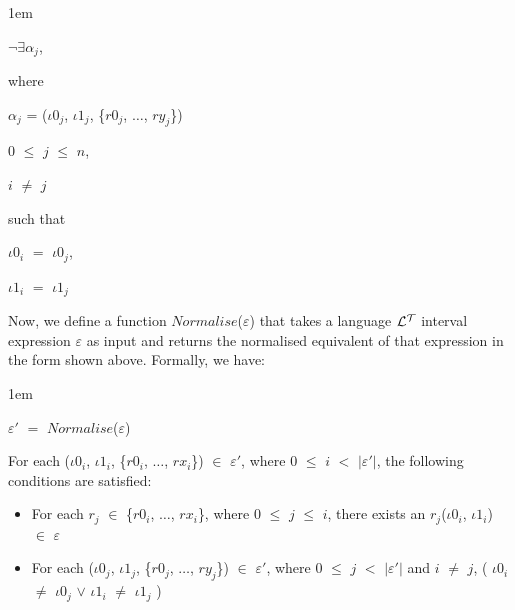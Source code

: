 \documentclass[11pt]{report}
\newenvironment{vquote}
{
  \begin{list}{}{\leftmargin 1em}\item[]
}
{
  \end{list}
}
\begin{document}
\begin{itemize}
              \begin{vquote}
                $\lnot$$\exists$${\alpha}_j$,

                where 

                \hspace{1em}
                ${\alpha}_j$ =
                  (${\iota}0_j$, ${\iota}1_j$, \{$r0_j$, $\ldots$, $ry_j$\})

                \hspace{1em}
                $0$ $\leq$ $j$ $\leq$ $n$,

                \hspace{1em}
                $i$ $\neq$ $j$

                such that

                \hspace{1em}
                ${\iota}0_i$ $=$ ${\iota}0_j$,

                \hspace{1em}
                ${\iota}1_i$ $=$ ${\iota}1_j$
              \end{vquote}

              Now, we define a function $Normalise$($\varepsilon$) that takes
              a language ${\cal L^T}$ interval expression $\varepsilon$ as
              input and returns the normalised equivalent of that expression in
              the form shown above. Formally, we have:

              \begin{vquote}
                ${\varepsilon}'$ $=$ $Normalise$($\varepsilon$)
              \end{vquote}

              \noindent
              For each
              (${\iota}0_i$, ${\iota}1_i$, \{$r0_i$, $\ldots$, $rx_i$\})
              $\in$ ${\varepsilon}'$,
              where $0$ $\leq$ $i$ $<$ $|{\varepsilon}'|$, the following
              conditions are satisfied:

              \begin{itemize}
                \item
                  For each $r_j$ $\in$ \{$r0_i$, $\ldots$, $rx_i$\}, where $0$
                  $\leq$ $j$ $\leq$ $i$, there exists an
                  $r_j$(${\iota}0_i$, ${\iota}1_i$) $\in$ $\varepsilon$

                \item
                  For each 
                  (${\iota}0_j$, ${\iota}1_j$, \{$r0_j$, $\ldots$, $ry_j$\})
                  $\in$ ${\varepsilon}'$, where $0$ $\leq$ $j$ $<$
                  $|{\varepsilon}'|$ and $i$ $\neq$ $j$, 
                  (
                    ${\iota}0_i$ $\neq$ ${\iota}0_j$ $\lor$
                    ${\iota}1_i$ $\neq$ ${\iota}1_j$
                  )
              \end{itemize}


\end{itemize}
\end{document}
